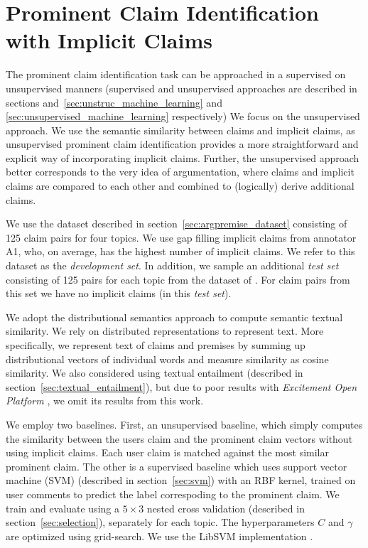 \section{Prominent Claim Identification with Implicit Claims}

The prominent claim identification task can be approached in a supervised on 
unsupervised manners (supervised and unsupervised approaches are described in 
sections and~\ref{sec:unstruc_machine_learning} and
\ref{sec:unsupervised_machine_learning} respectively)
We focus on the unsupervised approach. 
We use the semantic similarity between claims and implicit claims, as
unsupervised prominent claim identification provides a more straightforward and
explicit way of incorporating implicit claims. 
Further, the unsupervised approach better corresponds to the very idea of
argumentation, 
where claims and implicit claims are compared to each other and combined to 
(logically) derive additional claims. 

We use the dataset described in section~\ref{sec:argpremise_dataset} 
consisting of 125 claim pairs for four topics. 
We use gap filling implicit claims from annotator A1, who, on average, has the
highest number of implicit claims. 
We refer to this dataset as the \emph{development set}.
In addition, we sample an additional \emph{test set} consisting of 125 pairs for each topic
from the dataset of \citet{hasan2014you}. 
For claim pairs from this set we have no
implicit claims (in this \emph{test set}). 

We adopt the distributional semantics approach to compute semantic textual similarity. 
We rely on distributed representations \citep{mikolov2013distributed} to represent text. 
More specifically, we represent text of claims and premises by summing up distributional
vectors of individual words and measure similarity as cosine similarity. 
We also considered using textual entailment (described in section~\ref{sec:textual_entailment}),
but due to poor results with \textit{Excitement Open Platform}
\citep{pado2015design}, we omit its results from this work. 

We employ two baselines.  First, an unsupervised baseline, which simply
computes the similarity between the users claim and the prominent claim vectors
without using implicit claims. 
Each user claim is matched against the most similar prominent claim. 
The other is a supervised baseline which uses support vector machine (SVM)
(described in section~\ref{sec:svm}) with an RBF kernel, trained 
on user comments to predict the label correspoding to the 
prominent claim. 
We train and evaluate using a $5 \times 3$ nested cross validation (described in
section~\ref{sec:selection}), separately for each topic. 
The hyperparameters $C$ and $\gamma$ are optimized using grid-search. 
We use the LibSVM implementation \citep{chang2011libsvm}. 


